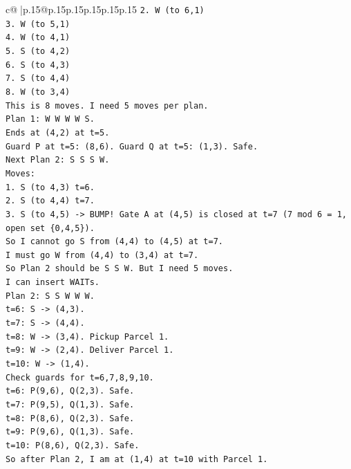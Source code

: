 \documentclass{article}
\begin{document}
{\begin{supertabular}{c@{$\;$}|p{.15\linewidth}@{}p{.15\linewidth}p{.15\linewidth}p{.15\linewidth}p{.15\linewidth}p{.15\linewidth}}
{{{\texttt{2. W (to 6,1)} \\
\texttt{3. W (to 5,1)} \\
\texttt{4. W (to 4,1)} \\
\texttt{5. S (to 4,2)} \\
\texttt{6. S (to 4,3)} \\
\texttt{7. S (to 4,4)} \\
\texttt{8. W (to 3,4)} \\
\texttt{This is 8 moves. I need 5 moves per plan.} \\
\texttt{Plan 1: W W W W S.} \\
\texttt{Ends at (4,2) at t=5.} \\
\texttt{Guard P at t=5: (8,6). Guard Q at t=5: (1,3). Safe.} \\
\texttt{Next Plan 2: S S S W.} \\
\texttt{Moves:} \\
\texttt{1. S (to 4,3) t=6.} \\
\texttt{2. S (to 4,4) t=7.} \\
\texttt{3. S (to 4,5) {-}> BUMP! Gate A at (4,5) is closed at t=7 (7 mod 6 = 1, open set \{0,4,5\}).} \\
\texttt{So I cannot go S from (4,4) to (4,5) at t=7.} \\
\texttt{I must go W from (4,4) to (3,4) at t=7.} \\
\texttt{So Plan 2 should be S S W. But I need 5 moves.} \\
\texttt{I can insert WAITs.} \\
\texttt{Plan 2: S S W W W.} \\
\texttt{t=6: S {-}> (4,3).} \\
\texttt{t=7: S {-}> (4,4).} \\
\texttt{t=8: W {-}> (3,4). Pickup Parcel 1.} \\
\texttt{t=9: W {-}> (2,4). Deliver Parcel 1.} \\
\texttt{t=10: W {-}> (1,4).} \\
\texttt{Check guards for t=6,7,8,9,10.} \\
\texttt{t=6: P(9,6), Q(2,3). Safe.} \\
\texttt{t=7: P(9,5), Q(1,3). Safe.} \\
\texttt{t=8: P(8,6), Q(2,3). Safe.} \\
\texttt{t=9: P(9,6), Q(1,3). Safe.} \\
\texttt{t=10: P(8,6), Q(2,3). Safe.} \\
\texttt{So after Plan 2, I am at (1,4) at t=10 with Parcel 1.} \\
}}}
\end{supertabular}}
\end{document}
